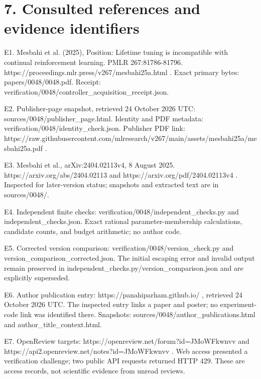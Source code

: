 \documentclass[10pt]{article}
\begin{document}
\section*{7. Consulted references and evidence identifiers}
E1. Mesbahi et al. (2025), Position: Lifetime tuning is incompatible with continual reinforcement learning. PMLR 267:81786-81796. https://proceedings.mlr.press/v267/mesbahi25a.html . Exact primary bytes: papers/0048/0048.pdf. Receipt: verification/0048/controller\_acquisition\_receipt.json.\par
E2. Publisher-page snapshot, retrieved 24 October 2026 UTC: sources/0048/publisher\_page.html. Identity and PDF metadata: verification/0048/identity\_check.json. Publisher PDF link: https://raw.githubusercontent.com/mlresearch/v267/main/assets/mesbahi25a/mesbahi25a.pdf .\par
E3. Mesbahi et al., arXiv:2404.02113v4, 8 August 2025. https://arxiv.org/abs/2404.02113 and https://arxiv.org/pdf/2404.02113v4 . Inspected for later-version status; snapshots and extracted text are in sources/0048/.\par
E4. Independent finite checks: verification/0048/independent\_checks.py and independent\_checks.json. Exact rational parameter-membership calculations, candidate counts, and budget arithmetic; no author code.\par
E5. Corrected version comparison: verification/0048/version\_check.py and version\_comparison\_corrected.json. The initial escaping error and invalid output remain preserved in independent\_checks.py/version\_comparison.json and are explicitly superseded.\par
E6. Author publication entry: https://panahiparham.github.io/ , retrieved 24 October 2026 UTC. The inspected entry links a paper and poster; no experiment-code link was identified there. Snapshots: sources/0048/author\_publications.html and author\_title\_context.html.\par
E7. OpenReview targets: https://openreview.net/forum?id=JMoWFkwnvv and https://api2.openreview.net/notes?id=JMoWFkwnvv . Web access presented a verification challenge; two public API requests returned HTTP 429. These are access records, not scientific evidence from unread reviews.\par
\end{document}
